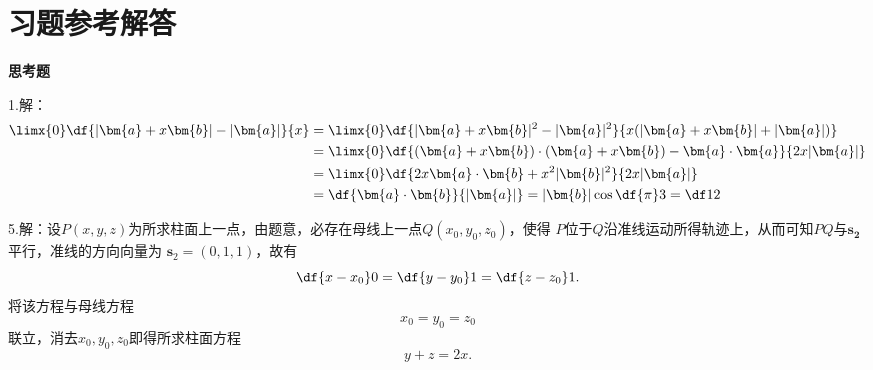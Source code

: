 % 
% 
% 
% 
% 
% 
% 
% 
% 
% 

% 




\newpage

\section*{习题参考解答}

{\bf 思考题}

1.\;解：
\begin{align*}
	\limx{0}\df{|\bm{a}+x\bm{b}|-|\bm{a}|}{x}
	&=\limx{0}\df{|\bm{a}+x\bm{b}|^2-|\bm{a}|^2}{x(|\bm{a}+x\bm{b}|+|\bm{a}|)}\\
	&=\limx{0}\df{(\bm{a}+x\bm{b})\cdot(\bm{a}+x\bm{b})
	-\bm{a}\cdot\bm{a}}{2x|\bm{a}|}\\
	&=\limx{0}\df{2x\bm{a}\cdot\bm{b}+x^2|\bm{b}|^2}{2x|\bm{a}|}\\
	&=\df{\bm{a}\cdot\bm{b}}{|\bm{a}|}=|\bm{b}|\cos\df{\pi}3=\df12
\end{align*}

5.\;解：设$P(x,y,z)$为所求柱面上一点，由题意，必存在母线上一点$Q(x_0,y_0,z_0)$，使得
$P$位于$Q$沿准线运动所得轨迹上，从而可知$PQ$与$\bm{s_2}$平行，准线的方向向量为
$\bm{s}_2=(0,1,1)$，故有
$$\df{x-x_0}0=\df{y-y_0}1=\df{z-z_0}1.$$
将该方程与母线方程
$$x_0=y_0=z_0$$
联立，消去$x_0,y_0,z_0$即得所求柱面方程
$$y+z=2x.$$

